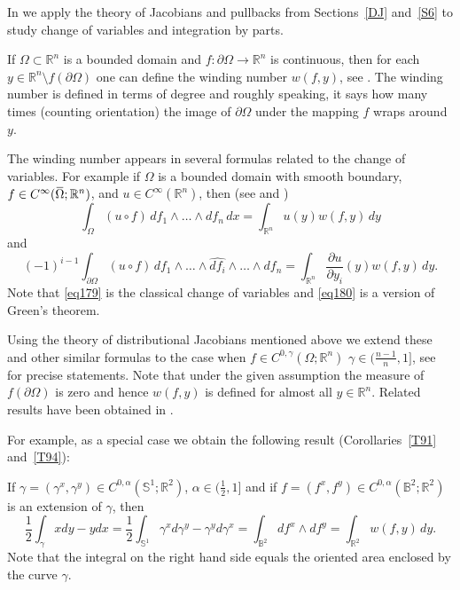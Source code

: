 \documentclass[intlimits,12pt,reqno]{amsart}
\newcommand{\Sph}{\mathbb S}
\newcommand{\bbbr}{\mathbb R}
\newcommand{\bbbb}{\mathbb B}
\newcommand{\R}{\mathbb R}
\newcommand{\overbar}[1]{\mkern 1.7mu\overline{\mkern-1.7mu#1\mkern-1.5mu}\mkern 1.5mu}
\numberwithin{equation}{section}
\theoremstyle{definition}
\begin{document}
In  we apply the theory of Jacobians and pullbacks from Sections~\ref{DJ} and~\ref{S6} to study change of variables and integration by parts.

If $\Omega\subset\R^n$ is a bounded domain and $f:\partial\Omega\to\R^n$ is continuous, then for each $y\in\R^n\setminus f(\partial\Omega)$ one can define the winding number $w(f,y)$, see . The winding number is defined in terms of degree and roughly speaking, it says how many times (counting orientation) the image of $\partial\Omega$ under the mapping $f$ wraps around $y$. 

The winding number appears in several formulas related to the change of variables. For example if 
$\Omega$ is a bounded domain with smooth boundary, 
$f\in C^\infty(\overbar{\Omega};\R^n)$, and $u\in C^\infty(\R^n)$, then (see  and )
\begin{equation}
\label{eq179}
\int_{\Omega}(u\circ f)\, df_1\wedge\dots\wedge df_n\, dx = \int_{\R^n}u(y)w(f,y)\, dy
\end{equation}
and
\begin{equation}
\label{eq180}
(-1)^{i-1}\int_{\partial\Omega} (u\circ f)\,df_1\wedge\ldots\wedge\widehat{df_i}\wedge\ldots\wedge df_n=
\int_{\R^n}\frac{\partial u}{\partial y_i}(y)w(f,y)\, dy.
\end{equation}
Note that \eqref{eq179} is the classical change of variables and \eqref{eq180} is a version of Green's theorem.

Using the theory of distributional Jacobians mentioned above we extend these and other similar formulas to the case when $f\in C^{0,\gamma}(\Omega;\R^n)$ $\gamma\in\big(\frac{n-1}{n},1\big]$, see  for precise statements. Note that under the given assumption the measure of $f(\partial\Omega)$ is zero and hence $w(f,y)$ is defined for almost all $y\in\R^n$.
Related results have been obtained in \cite{Conti,LZ,LP17,LPS21,ZustGAFA}.

For example, as a special case we obtain the following result (Corollaries~\ref{T91} and~\ref{T94}):

If $\gamma=(\gamma^x,\gamma^y)\in C^{0,\alpha}(\Sph^1;\R^2)$, $\alpha\in\big(\frac{1}{2},1\big]$ and if
$f=(f^x,f^y)\in C^{0,\alpha}(\bbbb^2;\R^2)$ is an extension of $\gamma$, then
\begin{equation}
\label{eq182}
\frac{1}{2}\int_\gamma xdy-ydx=
\frac{1}{2}\int_{\Sph^1}\gamma^xd\gamma^y-\gamma^yd\gamma^x=\int_{\bbbb^2}df^x\wedge df^y=
\int_{\bbbr^2} w(f,y)\, dy.
\end{equation}
Note that the integral on the right hand side equals the oriented area enclosed by the curve $\gamma$.
\end{document}
